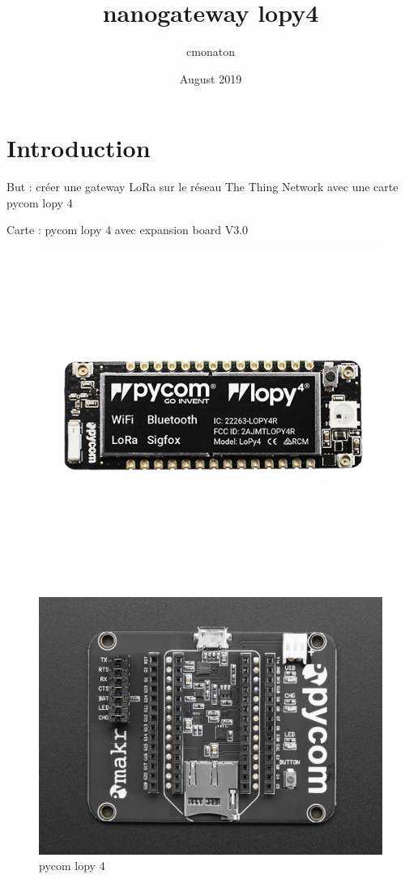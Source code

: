 \documentclass{article}
\title{nanogateway lopy4}
\author{cmonaton }
\date{August 2019}
\begin{document}
\maketitle
\section{Introduction}
But : créer une gateway LoRa sur le réseau The Thing Network avec une carte pycom lopy 4

Carte : pycom lopy 4 avec expansion board V3.0



\begin{figure}[H]
  \centering
  \begin{minipage}[b]{0.4\textwidth}
    \includegraphics[keepaspectratio=true,scale=1.7]{pycom_lopy4.jpeg}
        \caption{pycom lopy 4}
  \end{minipage}
  \hfill
  \begin{minipage}[b]{0.4\textwidth}
   \includegraphics[keepaspectratio=true,scale=0.5]{pycom_expansion_board.jpeg}

\end{minipage}
\end{figure}
\end{document}
